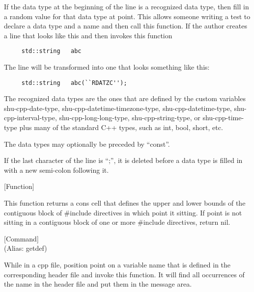 \begin{doc-string}
If the data type at the beginning of the line is a recognized data type, then
fill in a random value for that data type at point.  This allows someone writing
a test to declare a data type and a name and then call this function.  If the
author creates a line that looks like this and then invokes this function

\small{\begin{verbatim}
     std::string   abc
\end{verbatim}}

The line will be transformed into one that looks something like this:

\small{\begin{verbatim}
     std::string   abc(``RDATZC'');
\end{verbatim}}

The recognized data types are the ones that are defined by the custom variables
shu-cpp-date-type, shu-cpp-datetime-timezone-type, shu-cpp-datetime-type,
shu-cpp-interval-type, shu-cpp-long-long-type, shu-cpp-string-type, or
shu-cpp-time-type plus many of the standard C++ types, such as int, bool, short,
etc.

The data types may optionally be preceded by ``const''.

If the last character of the line is ``;'', it is deleted before a data type is
filled in with a new semi-colon following it.
\end{doc-string}

\vspace{1em}
\noindent
{}
\usebox{\funcname}
 \hfill [Function]

\begin{doc-string}
This function returns a cons cell that defines the upper and lower bounds of
the contiguous block of \#include directives in which point it sitting.  If point
is not sitting in a contiguous block of one or more \#include directives, return
nil.
\end{doc-string}

\vspace{1em}
\noindent
{}
\usebox{\funcname}
 \hfill [Command]\\%
 (Alias: getdef)

\begin{doc-string}
While in a cpp file, position point on a variable name that is defined in the
corresponding header file and invoke this function.  It will find all occurrences of
the name in the header file and put them in the message area.
\end{doc-string}

